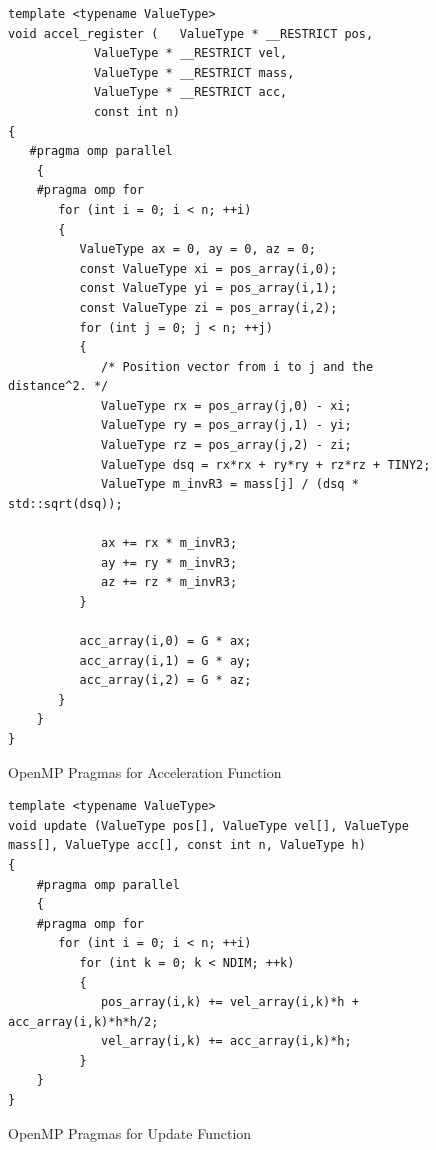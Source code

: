 \documentclass[12pt]{article} %
\begin{document}
\begin{table}[]
\centering
\caption{Weak Scaling Benchmark - Number of Particles: 8000}
\end{table}


\begin{figure}[]
\caption{OpenMP Pragmas for Acceleration Function}\label{fig:benchmark01}
\begin{lstlisting}
template <typename ValueType>
void accel_register (	ValueType * __RESTRICT pos, 
			ValueType * __RESTRICT vel, 
			ValueType * __RESTRICT mass, 
			ValueType * __RESTRICT acc, 
			const int n)
{
   #pragma omp parallel
    {
    #pragma omp for
       for (int i = 0; i < n; ++i)
       {
          ValueType ax = 0, ay = 0, az = 0;
          const ValueType xi = pos_array(i,0);
          const ValueType yi = pos_array(i,1);
          const ValueType zi = pos_array(i,2);
          for (int j = 0; j < n; ++j)
          {
             /* Position vector from i to j and the distance^2. */
             ValueType rx = pos_array(j,0) - xi;
             ValueType ry = pos_array(j,1) - yi;
             ValueType rz = pos_array(j,2) - zi;
             ValueType dsq = rx*rx + ry*ry + rz*rz + TINY2;
             ValueType m_invR3 = mass[j] / (dsq * std::sqrt(dsq));
    
             ax += rx * m_invR3;
             ay += ry * m_invR3;
             az += rz * m_invR3;
          }
    
          acc_array(i,0) = G * ax;
          acc_array(i,1) = G * ay;
          acc_array(i,2) = G * az;
       }
    }
}
\end{lstlisting}
\end{figure}

\begin{figure}[]
\caption{OpenMP Pragmas for Update Function}\label{fig:benchmark01}
\begin{lstlisting}
template <typename ValueType>
void update (ValueType pos[], ValueType vel[], ValueType mass[], ValueType acc[], const int n, ValueType h)
{
    #pragma omp parallel
    {
    #pragma omp for
       for (int i = 0; i < n; ++i)
          for (int k = 0; k < NDIM; ++k)
          {
             pos_array(i,k) += vel_array(i,k)*h + acc_array(i,k)*h*h/2;
             vel_array(i,k) += acc_array(i,k)*h;
          }
    }
}
\end{lstlisting}
\end{figure}
\end{document}
